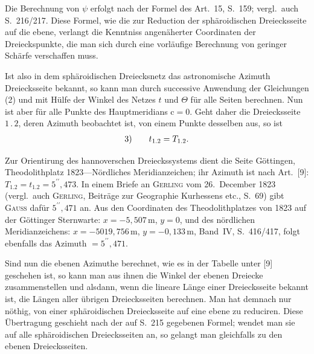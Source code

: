 \par\noindent\hspace*{\parindent}Die Berechnung von $\psi$ erfolgt nach der Formel des Art.~15, S.~159;
vergl.~auch S.~216/217. Diese Formel, wie die zur Reduction der sphäroidischen
Dreiecksseite auf die ebene, verlangt die Kenntniss angenäherter Coordinaten der
Dreieckspunkte, die man sich durch eine vorläufige Berechnung von geringer Schärfe verschaffen muss.

\par\noindent\hspace*{\parindent}Ist also in dem sphäroidischen Dreiecksnetz das astronomische Azimuth
 Dreiecksseite bekannt, so kann man durch successive Anwendung
der Gleichungen (2) und mit Hülfe der Winkel des Netzes $t$ und $\Theta$
für alle Seiten berechnen. Nun ist aber für alle Punkte des Hauptmeridians
$\mathrm{c}=0$. Geht daher die Dreiecksseite $1\,.\,2$, deren Azimuth beobachtet ist,
von einem Punkte desselben aus, so ist
\[
\begin{array}{r@{\qquad}c}
3)&t_{1.2}=T_{1.2}.
\end{array}
\]

\par\noindent\hspace*{\parindent}Zur Orientirung des hannoverschen Dreieckssystems dient die Seite Göttingen,
Theodolithplatz 1823---Nördliches Meridianzeichen; ihr Azimuth ist nach Art.~[9]:
$T_{1.2}=t_{1.2}=5^{\prime\prime}{,}473$.
In einem Briefe an \textsc{Gerling} vom 26.~December 1823
(vergl.~auch \textsc{Gerling}, Beiträge zur Geographie Kurhessens etc., S.~69)
gibt \textsc{Gauss} dafür $5^{\prime\prime}{,}471$ an.
Aus den Coordinaten des Theodolithplatzes von 1823 auf der Göttinger Sternwarte:
$x=-5{,}507\,\mathrm{m}$, $y=0$, und des nördlichen Meridianzeichens:
$x=-5019{,}756\,\mathrm{m}$, $y=-0{,}133\,\mathrm{m}$, Band~IV,
S.~416/417, folgt ebenfalls das Azimuth $=5^{\prime\prime}{,}471$.

\par\noindent\hspace*{\parindent}Sind nun die ebenen Azimuthe berechnet, wie es in der Tabelle unter [9]
geschehen ist, so kann man aus ihnen die Winkel der ebenen Dreiecke zusammenstellen
und alsdann, wenn die lineare Länge einer Dreiecksseite bekannt ist,
die Längen aller übrigen Dreiecksseiten berechnen. Man hat demnach nur
 nöthig, von einer sphäroidischen Dreiecksseite auf eine ebene
zu reduciren. Diese Übertragung geschieht nach der auf S.~215 gegebenen Formel;
wendet man sie auf alle sphäroidischen Dreiecksseiten an, so gelangt man
gleichfalls zu den ebenen Dreiecksseiten.

